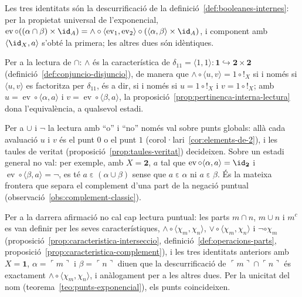 \begin{prova}
Les tres identitats són la descurrificació de la
definició~\ref{def:booleanes-internes}: per la propietat universal de
l'exponencial,
\(\operatorname{ev}\circ((\alpha\cap\beta)\times\id_A)
=\wedge\circ\langle\operatorname{ev}_1,\operatorname{ev}_2\rangle\circ(\langle\alpha,\beta\rangle\times\id_A)\),
i component amb \(\langle\id_X,a\rangle\) s'obté la primera; les altres
dues són idèntiques.

Per a la lectura de \(\cap\): \(\wedge\) és la característica de
\(\delta_{11}=\langle1,1\rangle\colon\mathbf1\hookrightarrow\mathbf2\times\mathbf2\)
(definició~\ref{def:conjuncio-disjuncio}), de manera que
\(\wedge\circ\langle u,v\rangle=1\circ{!}_X\) si i només si
\(\langle u,v\rangle\) es factoritza per \(\delta_{11}\), és a dir, si i
només si \(u=1\circ{!}_X\) i \(v=1\circ{!}_X\); amb
\(u=\operatorname{ev}\circ\langle\alpha,a\rangle\) i
\(v=\operatorname{ev}\circ\langle\beta,a\rangle\), la
proposició~\ref{prop:pertinenca-interna-lectura} dona l'equivalència, a
qualsevol estadi.

Per a \(\cup\) i \(\neg\) la lectura amb \enquote{o} i \enquote{no} només
val sobre punts globals: allà cada avaluació \(u\) i \(v\) és el punt
\(0\) o el punt \(1\) (corol·lari~\ref{cor:elements-de-2}), i les taules
de veritat (proposició~\ref{prop:taules-veritat}) decideixen. Sobre un estadi
general no val: per exemple, amb \(X=\mathbf2\), \(a\) tal que
\(\operatorname{ev}\circ\langle\alpha,a\rangle=\id_{\mathbf2}\) i
\(\operatorname{ev}\circ\langle\beta,a\rangle=\neg\), es té
\(a\mathrel{\varepsilon}(\alpha\cup\beta)\) sense que
\(a\mathrel{\varepsilon}\alpha\) ni \(a\mathrel{\varepsilon}\beta\).
És la mateixa frontera que separa el complement d'una part de la negació
puntual (observació~\ref{obs:complement-classic}).

Per a la darrera afirmació no cal cap lectura puntual: les parts
\(m\cap n\), \(m\cup n\) i \(m^c\) es van definir per les seves
característiques, \(\wedge\circ\langle\chi_m,\chi_n\rangle\),
\(\vee\circ\langle\chi_m,\chi_n\rangle\) i \(\neg\circ\chi_m\)
(proposició~\ref{prop:caracteristica-interseccio}, definició~\ref{def:operacions-parts}, proposició~\ref{prop:caracteristica-complement}), i les tres identitats
anteriors amb \(X=\mathbf1\), \(\alpha=\ulcorner m\urcorner\) i
\(\beta=\ulcorner n\urcorner\) diuen que la descurrificació de
\(\ulcorner m\urcorner\cap\ulcorner n\urcorner\) és exactament
\(\wedge\circ\langle\chi_m,\chi_n\rangle\), i anàlogament per a les
altres dues. Per la unicitat del nom (teorema~\ref{teo:punts-exponencial}),
els punts coincideixen.
\end{prova}

